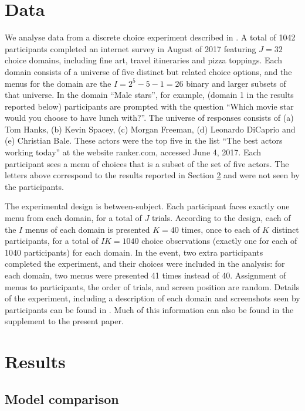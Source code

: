 \documentclass[11pt,letter]{article}
\begin{document}
\section{Data}\label{s:data}

We analyse data from a discrete choice experiment described in .
A total of 1042 participants completed an internet survey in August of 2017 featuring $J=32$ choice domains, including fine art, travel itineraries and pizza toppings.
Each domain consists of a universe of five distinct but related choice options, and the menus for the domain are the $I = 2^5 - 5 - 1 = 26$ binary and larger subsets of that universe.
In the domain ``Male stars'', for example, (domain 1 in the results reported below) participants are prompted with the question ``Which movie star would you choose to have lunch with?''.
The universe of responses consists of (a) Tom Hanks, (b) Kevin Spacey, (c) Morgan Freeman, (d) Leonardo DiCaprio and (e) Christian Bale.
These actors were the top five in the list ``The best actors working today'' at the website ranker.com, accessed June 4, 2017.
Each participant sees a menu of choices that is a subset of the set of five actors.
The letters above correspond to the results reported in Section \ref{s:results} and were not seen by the participants.

The experimental design is between-subject.
Each participant faces exactly one menu from each domain, for a total of $J$ trials.
According to the design, each of the $I$ menus of each domain is presented $K=40$ times, once to each of $K$ distinct participants, for a total of $IK = 1040$ choice observations (exactly one for each of 1040 participants) for each domain.
In the event, two extra participants completed the experiment, and their choices were included in the analysis: for each domain, two menus were presented 41 times instead of 40.
Assignment of menus to participants, the order of trials, and screen position are random.
Details of the experiment, including a description of each domain and screenshots seen by participants can be found in .
Much of this information can also be found in the supplement to the present paper.

\section{Results}\label{s:results}

\subsection{Model comparison}
\end{document}
